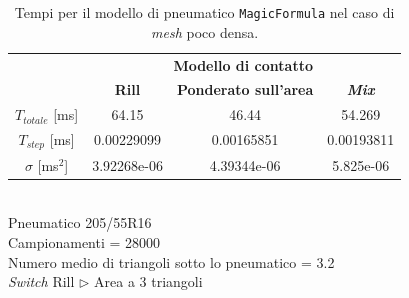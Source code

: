 %
\clearpage
%
\begin{table}
	\centering
	\begin{tabular}{c|c|c|c|}
		\cline{2-4} 
		& \multicolumn{3}{c|}{\textbf{Modello di contatto}} \\
		\cline{2-4} 
		& \textbf{Rill} & \textbf{Ponderato sull'area} & \textbf{\textit{Mix}} \\ 
		\hline 
		\multicolumn{1}{|c|}{$T_{totale}$ [ms]} & 64.15 & 46.44 & 54.269 \\ 
		\hline 
		\multicolumn{1}{|c|}{$T_{step}$ [ms]} & 0.00229099 & 0.00165851 & 0.00193811 \\ 
		\hline 
		\multicolumn{1}{|c|}{$\sigma$ [ms$^2$]} & 3.92268e-06 & 4.39344e-06 & 5.825e-06 \\
		\hline 
	\end{tabular}
	\\[0.5cm]
	Pneumatico 205/55R16\\
	Campionamenti = 28000\\
	Numero medio di triangoli sotto lo pneumatico = 3.2\\
	\textit{Switch} Rill $\triangleright$ Area a 3 triangoli
	\caption{Tempi per il modello di pneumatico \texttt{MagicFormula} nel caso di \textit{mesh} poco densa.}
	\label{MFpiano}
\end{table}
